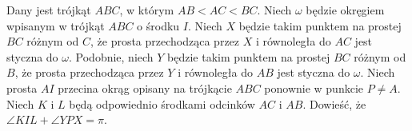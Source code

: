 \begin{exercise}[4/2024]
    Dany jest trójkąt $ABC$, w którym $AB < AC < BC$.
    Niech $\omega$ będzie okręgiem wpisanym w trójkąt $ABC$ o środku $I$.
    Niech $X$ będzie takim punktem na prostej $BC$ różnym od $C$, że prosta przechodząca przez $X$ i równoległa do $AC$ jest styczna do $\omega$.
    Podobnie, niech $Y$ będzie takim punktem na prostej $BC$ różnym od $B$, że prosta przechodząca przez $Y$ i równoległa do $AB$ jest styczna do $\omega$.
    Niech prosta $AI$ przecina okrąg opisany na trójkącie $ABC$ ponownie w punkcie $P \neq A$.
    Niech $K$ i $L$ będą odpowiednio środkami odcinków $AC$ i $AB$.
    Dowieść, że $\angle KIL + \angle YPX = \pi$.
\end{exercise}